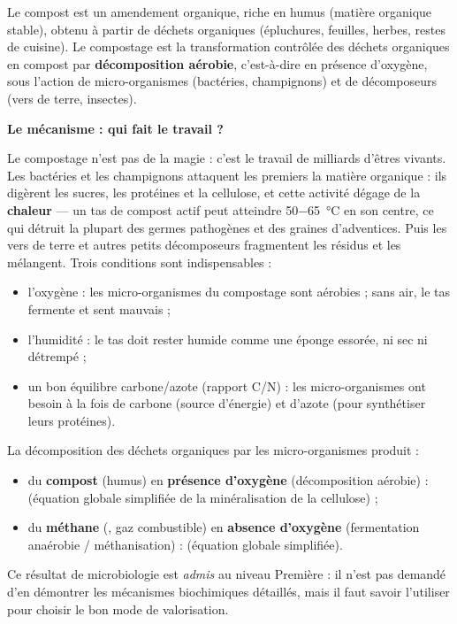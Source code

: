 \documentclass[11pt]{article}
\newcommand{\cle}[1]{{\popxbold\color{popdark}#1}}
\begin{document}
\begin{definition}
Le \cle{compost} est un amendement organique, riche en \cle{humus} (matière organique stable), obtenu à partir de déchets organiques (épluchures, feuilles, herbes, restes de cuisine). Le \cle{compostage} est la transformation contrôlée des déchets organiques en compost par \textbf{décomposition aérobie}, c'est-à-dire en présence d'oxygène, sous l'action de micro-organismes (bactéries, champignons) et de décomposeurs (vers de terre, insectes).
\end{definition}

\textbf{Le mécanisme : qui fait le travail ?}\par

Le compostage n'est pas de la magie : c'est le travail de milliards d'êtres vivants. Les \cle{bactéries} et les \cle{champignons} attaquent les premiers la matière organique : ils digèrent les sucres, les protéines et la cellulose, et cette activité dégage de la \textbf{chaleur} — un tas de compost actif peut atteindre \SI{50-65}{\celsius} en son centre, ce qui détruit la plupart des germes pathogènes et des graines d'adventices. Puis les \cle{vers de terre} et autres petits décomposeurs fragmentent les résidus et les mélangent. Trois conditions sont indispensables :
\begin{itemize}
\item l'\cle{oxygène} : les micro-organismes du compostage sont aérobies ; sans air, le tas fermente et sent mauvais ;
\item l'\cle{humidité} : le tas doit rester humide comme une éponge essorée, ni sec ni détrempé ;
\item un bon équilibre \cle{carbone/azote} (rapport C/N) : les micro-organismes ont besoin à la fois de carbone (source d'énergie) et d'azote (pour synthétiser leurs protéines).
\end{itemize}

\begin{propriete}
La décomposition des déchets organiques par les micro-organismes produit :
\begin{itemize}
\item du \textbf{compost} (humus) en \textbf{présence d'oxygène} (décomposition aérobie) :  (équation globale simplifiée de la minéralisation de la cellulose) ;
\item du \textbf{méthane} (, gaz combustible) en \textbf{absence d'oxygène} (fermentation anaérobie / méthanisation) :  (équation globale simplifiée).
\end{itemize}
Ce résultat de microbiologie est \emph{admis} au niveau Première : il n'est pas demandé d'en démontrer les mécanismes biochimiques détaillés, mais il faut savoir l'utiliser pour choisir le bon mode de valorisation.
\end{propriete}
\end{document}
